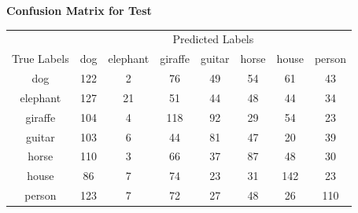 \documentclass{article}
\begin{document}
\begin{center}
    \textbf{Confusion Matrix for Test}
    
    \begin{tabular}{c|ccccccc}
    \toprule
    & \multicolumn{7}{c}{Predicted Labels} \\
    \cmidrule(lr){2-8}
    True Labels & dog & elephant & giraffe & guitar & horse & house & person \\
    \midrule
    dog & 122 & 2 & 76 & 49 & 54 & 61 & 43 \\
    elephant & 127 & 21 & 51 & 44 & 48 & 44 & 34 \\
    giraffe & 104 & 4 & 118 & 92 & 29 & 54 & 23 \\
    guitar & 103 & 6 & 44 & 81 & 47 & 20 & 39 \\
    horse & 110 & 3 & 66 & 37 & 87 & 48 & 30 \\
    house & 86 & 7 & 74 & 23 & 31 & 142 & 23 \\
    person & 123 & 7 & 72 & 27 & 48 & 26 & 110 \\
    \bottomrule
    \end{tabular}
    \label{tab:confusion_matrix_test}
\end{center}
\end{document}

